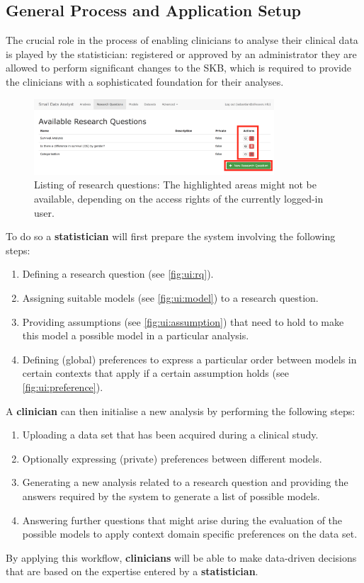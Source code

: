 \subsection{General Process and Application Setup}
\label{sub:process}
The crucial role in the process of enabling clinicians to analyse their clinical data is played by the statistician: registered or approved by an administrator they are allowed to perform significant changes to the \gls{SKB}, which is required to provide the clinicians with a sophisticated foundation for their analyses. 

\begin{figure}[htbp]
\centering
\includegraphics[width=0.8\textwidth]{figures/ui_RQ}
\caption{Listing of research questions: The highlighted areas might not be available, depending on the access rights of the currently logged-in user.}
\label{fig:ui:rq}
\end{figure}

To do so a \textbf{statistician} will first prepare the system involving the following steps:

\begin{enumerate}
	\item Defining a research question (see \autoref{fig:ui:rq}).
	\item Assigning suitable models (see \autoref{fig:ui:model}) to a research question.
	\item Providing assumptions (see \autoref{fig:ui:assumption}) that need to hold to make this model a possible model in a particular analysis.
	\item Defining (global) preferences to express a particular order between models in certain contexts that apply if a certain assumption holds (see \autoref{fig:ui:preference}).
\end{enumerate}

\bigskip

A \textbf{clinician} can then initialise a new analysis by performing the following steps:
 
\begin{enumerate}
	\item Uploading a data set that has been acquired during a clinical study.
	\item Optionally expressing (private) preferences between different models.
	\item Generating a new analysis related to a research question and providing the answers required by the system to generate a list of possible models.
	\item Answering further questions that might arise during the evaluation of the possible models to apply context domain specific preferences on the data set.
\end{enumerate}
\bigskip

By applying this workflow, \textbf{clinicians} will be able to make data-driven decisions that are based on the expertise entered by a \textbf{statistician}.
